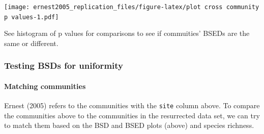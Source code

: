 \documentclass[]{article}
\let\oldparagraph\paragraph
\renewcommand{\paragraph}[1]{\oldparagraph{#1}\mbox{}}
\begin{document}
\texttt{[image: ernest2005\_replication\_files/figure-latex/plot cross community p values-1.pdf]}

See histogram of p values for comparisons to see if commuities' BSEDs
are the same or different.

\subsubsection{Testing BSDs for
uniformity}\label{testing-bsds-for-uniformity}

\paragraph{Matching communities}\label{matching-communities}

Ernest (2005) refers to the communities with the \texttt{site} column
above. To compare the communities above to the communities in the
resurrected data set, we can try to match them based on the BSD and BSED
plots (above) and species richness.
\end{document}

